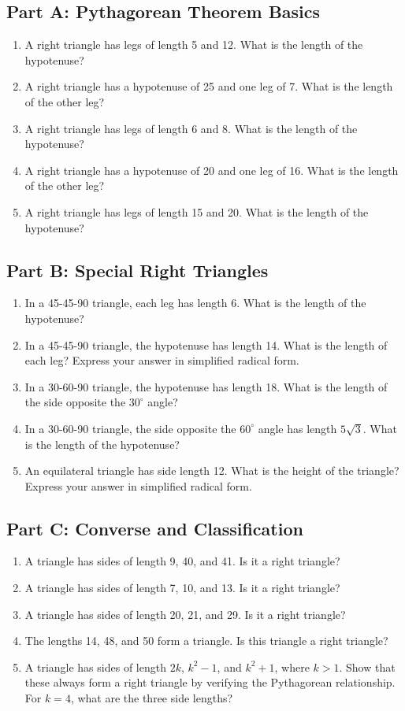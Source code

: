 \documentclass[14pt]{extarticle}
\begin{document}
\subsection*{Part A: Pythagorean Theorem Basics}
\begin{enumerate}
  \item A right triangle has legs of length 5 and 12. What is the length of the hypotenuse?
  \item A right triangle has a hypotenuse of 25 and one leg of 7. What is the length of the other leg?
  \item A right triangle has legs of length 6 and 8. What is the length of the hypotenuse?
  \item A right triangle has a hypotenuse of 20 and one leg of 16. What is the length of the other leg?
  \item A right triangle has legs of length 15 and 20. What is the length of the hypotenuse?
\end{enumerate}

\subsection*{Part B: Special Right Triangles}
\begin{enumerate}
  \item In a 45-45-90 triangle, each leg has length 6. What is the length of the hypotenuse?
  \item In a 45-45-90 triangle, the hypotenuse has length 14. What is the length of each leg? Express your answer in simplified radical form.
  \item In a 30-60-90 triangle, the hypotenuse has length 18. What is the length of the side opposite the \(30^\circ\) angle?
  \item In a 30-60-90 triangle, the side opposite the \(60^\circ\) angle has length \(5\sqrt{3}\). What is the length of the hypotenuse?
  \item An equilateral triangle has side length 12. What is the height of the triangle? Express your answer in simplified radical form.
\end{enumerate}

\subsection*{Part C: Converse and Classification}
\begin{enumerate}
  \item A triangle has sides of length 9, 40, and 41. Is it a right triangle?
  \item A triangle has sides of length 7, 10, and 13. Is it a right triangle?
  \item A triangle has sides of length 20, 21, and 29. Is it a right triangle?
  \item The lengths 14, 48, and 50 form a triangle. Is this triangle a right triangle?
  \item A triangle has sides of length \(2k\), \(k^2 - 1\), and \(k^2 + 1\), where \(k > 1\). Show that these always form a right triangle by verifying the Pythagorean relationship. For \(k = 4\), what are the three side lengths?
\end{enumerate}
\end{document}
